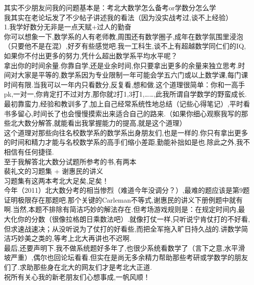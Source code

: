 \documentclass[a4paper]{ctexart}
\begin{document}
\noindent
其实不少朋友问我的问题基本是：考北大数学怎么备考or学数分怎么学\\
我其实在老论坛发了不少帖子讲述我的看法（因为没实战考过,谈不上经验）\\
1.我学好数分无非是一点天赋+过人的勤奋\\
你可以想象一下,数学系的人有老师教,周围还有数学圈子,成年在数学氛围里浸泡（只要他不是在混）,好歹有些感觉吧.我一工科生,谈不上有超越数学同仁们的IQ,如果你不付出更多的努力,凭什么超出数学系平均水平呢？\\
拿出你的时间余量.你靠自学,还是业余时间,你只要拿出更多的余量来独立思考.时间对大家是平等的,数学系因为专业限制一年可能会学五六门或以上数学课,每门课时间有限.当我可以一年内只看数分,反复看,想和做.这个道理很简单：你和一高手pk,一对一,你肯定打不过对方,那你就2打1,3打1,……,此我所谓自学数学的野蛮成长.\\
最初靠蛮力,经验和教训多了,加上自己经常系统性地总结（记些心得笔记）,平时看书多留心,时间长了也会慢慢摸索出来适合自己的路来.（如果你细心观察我写的那些北大数分解答,就能看出我掌握能力的提高,就是这个道理）\\
这个道理对那些向往名校数学系的数学系出身朋友们,也是一样的.你只有拿出更多的时间和精力才能与名校数学系的高手们缩小差距,勤能补拙如是也.除此之外,我不相信有任何捷径.\\
至于我解答北大数分试题所参考的书,有两本\\
裴礼文的习题集 + 谢惠民的讲义\\
习题集有这两本考北大足矣,足矣！\\
今年（2011）北大数分考的相当惨烈（难道今年没调分？）,最难的题应该是第9题证明极限存在那题吧.那个关键的Carleman不等式,谢惠民的讲义下册例题中就有啊.当然,本题不排除有简洁巧妙的解法存在.但考场游戏规则是：在规定时间内,最大化你的分数（很像拉格朗日乘数法吧）.就像打仗一样,只听说宁肯仗打的不好看,但求速战速决；从没听说为了仗打的好看些,而把全军拖入旷日持久战的.讲数学简洁巧妙美之类的,等考上北大再讲也不迟啊.\\
最后,还要声明下.我不做系统题好多年了,也很少系统看数学了（言下之意,水平滑坡严重）,偶尔也回论坛看看.但实在是尚无多余精力帮助那些考研或学数学的朋友们了.求助那些身在北大的网友们才是考北大正道.\\
祝所有关心我的新老朋友们心想事成,一帆风顺！\\
\end{document}
